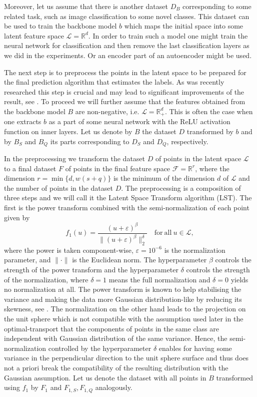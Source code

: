 \documentclass[letterpaper]{article} \usepackage{aaai20}  \usepackage{times}  \usepackage{helvet} \usepackage{courier}  \usepackage[hyphens]{url}  \usepackage{graphicx} \urlstyle{rm} \def\UrlFont{\rm}  \usepackage{graphicx}  \frenchspacing  \setlength{\pdfpagewidth}{8.5in}  \setlength{\pdfpageheight}{11in}  \usepackage[ruled,vlined]{algorithm2e}
\begin{document}
Moreover, let us assume that there is another dataset $D_B$ corresponding to some related task, such as image classification to some novel classes.
This dataset can be used to train the backbone model $b$ which maps the initial space into some latent feature space $\mathcal L = \mathbb R^d$. 
In order to train such a model one might train the neural network for classification and then remove the last classification layers as we did in the experiments. 
Or an encoder part of an autoencoder might be used. 

The next step is to preprocess the points in the latent space to be prepared for the final prediction algorithm that estimates the labels.
As was recently researched this step is crucial and may lead to significant improvements of the result, see \cite{wang2019simpleshot}.
To proceed we will further assume that the features obtained from the backbone model $B$ are non-negative, i.e. $\mathcal L = \mathbb R_+^d$. 
This is often the case when one extracts $b$ as a part of some neural network with the ReLU activation function on inner layers. 
Let us denote by $B$ the dataset $D$ transformed by $b$ and by $B_S$ and $B_Q$ its parts corresponding to $D_S$ and $D_Q$, respectively.

In the preprocessing we transform the dataset $D$ of points in the latent space $\mathcal L$ to a final dataset $F$ of points in the final 
feature space $\mathcal F = \mathbb R^r$, where the dimension 
$r = \min\{d, w (s + q)\}$ is the minimum of the dimension $d$ of $\mathcal L$ and the number of points in the dataset $D$.
The preprocessing is a composition of three steps and we will call it the Latent Space Transform algorithm (LST). The first is the power transform combined with the semi-normalization of each point given by
\[
    f_1(u) = \frac{(u + \varepsilon)^{\beta}}{\|(u + \varepsilon)^\beta\|_{2}^{\delta}}\quad \mathrm{for\ all}\ u \in \mathcal L,
\]
where the power is taken component-wise, $\varepsilon = 10^{-6}$ is the normalization parameter, and $\| \cdot \|$ is the Euclidean norm.
The hyperparameter $\beta$ controls the strength of the power transform and the hyperparameter $\delta$ controls the strength of 
the normalization, where $\delta = 1$ means the full normalization and $\delta = 0$ yields no normalization at all.
The power transform is known to help stabilising the variance and making the data more Gaussian distribution-like by reducing its skewness, see \cite{boxcox1964}.
The normalization on the other hand leads to the projection on the unit sphere which is not compatible with the assumption used later in the optimal-transport that the components of points in the same class are independent with Gaussian distribution of the same variance.
Hence, the semi-normalization controlled by the hyperparameter $\delta$ enables for having some variance in the perpendicular 
direction to the unit sphere surface and thus does not a priori break the compatibility of the resulting distribution with the Gaussian assumption.
Let us denote the dataset with all points in $B$ transformed using $f_1$ by $F_1$ and $F_{1,S}, F_{1,Q}$ analogously.
\end{document}
